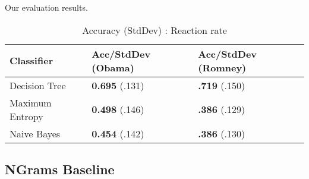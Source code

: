 
Our evaluation results.


\begin{table}[H]
\begin{centering}
\begin{tabular}{ l | l | l }
Classifier & Acc/StdDev (Obama) & Acc/StdDev (Romney) \\
\hline
Decision Tree & \textbf{0.695} (.131) & \textbf{.719} (.150) \\
Maximum Entropy & \textbf{0.498} (.146) & \textbf{.386} (.129) \\
Naive Bayes & \textbf{0.454} (.142) & \textbf{.386} (.130) \\
\end{tabular}
\caption{Accuracy (StdDev) : Reaction rate}
\end{centering}
\end{table}

\subsection{NGrams Baseline}
